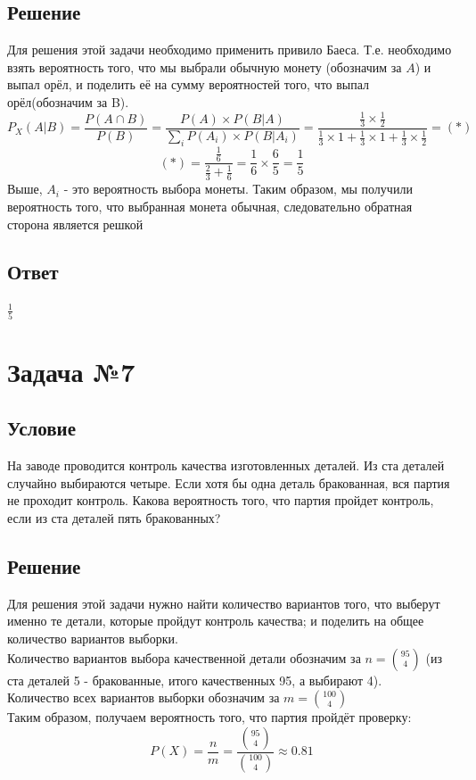 \documentclass{article}
\begin{document}
\subsection*{Решение}
Для решения этой задачи необходимо применить привило Баеса. Т.е. необходимо взять вероятность того, что мы выбрали обычную монету (обозначим за $A$) и выпал орёл, и поделить её на сумму вероятностей того, что выпал орёл(обозначим за B).\\
\[
    P_X(A|B) = \frac{P(A \cap B)}{P(B)} = \frac{P(A) \times P(B|A)}{\sum_i P(A_i)\times P(B|A_i)} = \frac{\frac{1}{3}\times\frac{1}{2}}{\frac{1}{3} \times 1 + \frac{1}{3} \times 1 + \frac{1}{3}\times\frac{1}{2}} = (*)
\]
\[
    (*) = \frac{\frac{1}{6}}{\frac{2}{3} + \frac{1}{6}} = \frac{1}{6} \times \frac{6}{5} = \frac{1}{5}
\]
Выше, $A_i$ - это вероятность выбора монеты.
Таким образом, мы получили вероятность того, что выбранная монета обычная, следовательно обратная сторона является решкой
\subsection*{Ответ}
$\frac{1}{5}$
\section*{Задача №7}
\subsection*{Условие}
На заводе проводится контроль качества изготовленных деталей. Из ста
деталей случайно выбираются четыре. Если хотя бы одна деталь бракованная, вся
партия не проходит контроль. Какова вероятность того, что партия пройдет контроль,
если из ста деталей пять бракованных? 
\subsection*{Решение}
Для решения этой задачи нужно найти количество вариантов того, что выберут именно те детали, которые пройдут контроль качества; и поделить на общее количество вариантов выборки.\\
Количество вариантов выбора качественной детали обозначим за $n = \binom{95}{4}$ (из ста деталей 5 - бракованные, итого качественных 95, а выбирают 4).\\
Количество всех вариантов выборки обозначим за $m = \binom{100}{4}$\\
Таким образом, получаем вероятность того, что партия пройдёт проверку:\\
\[
    P(X) = \frac{n}{m} = \frac{\binom{95}{4}}{\binom{100}{4}} \approx 0.81
\]
\end{document}
